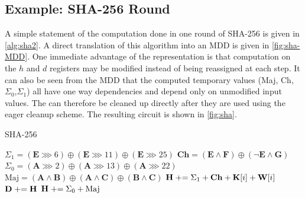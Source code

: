 \subsection{Example: SHA-256 Round}

A simple statement of the computation done in one round of SHA-256 is given in
\cref{alg:sha2}. A direct translation of this algorithm into an MDD is given in
\cref{fig:sha-MDD}.  One immediate advantage of the representation is that
computation on the $h$ and $d$ registers may be modified instead of being
reassigned at each step. It can also be seen from the MDD that the computed
temporary values (Maj, Ch, $\Sigma_0$,$\Sigma_1$) all have one way dependencies
and depend only on unmodified input values. The can therefore be cleaned up
directly after they are used using the eager cleanup scheme. The resulting
circuit is shown in \cref{fig:sha}.

\begin{algorithm}
\caption{SHA-256}
\label{alg:sha2}
\begin{algorithmic}
    \State \hspace*{1em} $\Sigma_1 = (\mathbf{E} \ggg 6) \oplus (\mathbf{E} \ggg 11) \oplus  (\mathbf{E} \ggg 25)$
    \State \hspace*{1em} $\mathbf{Ch} = (\mathbf{E} \land \mathbf{F}) \oplus ( \neg\mathbf{E}\land \mathbf{G})$
    \State \hspace*{1em} $\Sigma_0 = (\mathbf{A} \ggg 2) \oplus (\mathbf{A} \ggg 13) \oplus (\mathbf{A} \ggg 22)$
    \State \hspace*{1em} $\text{Maj} = (\mathbf{A} \land \mathbf{B}) \oplus (\mathbf{A} \land \mathbf{C}) \oplus (\mathbf{B}\land\mathbf{C})$
    \State \hspace*{1em} $\mathbf{H} \mathrel{+}= \Sigma_1 + \mathbf{Ch} + \mathbf{K}[i] + \mathbf{W}[i]$
    \State \hspace*{1em} $\mathbf{D} \mathrel{+}= \mathbf{H}$
    \State \hspace*{1em} $\mathbf{H} \mathrel{+}= \Sigma_0 + \text{Maj}$
  \EndFor
\end{algorithmic}
\end{algorithm}

